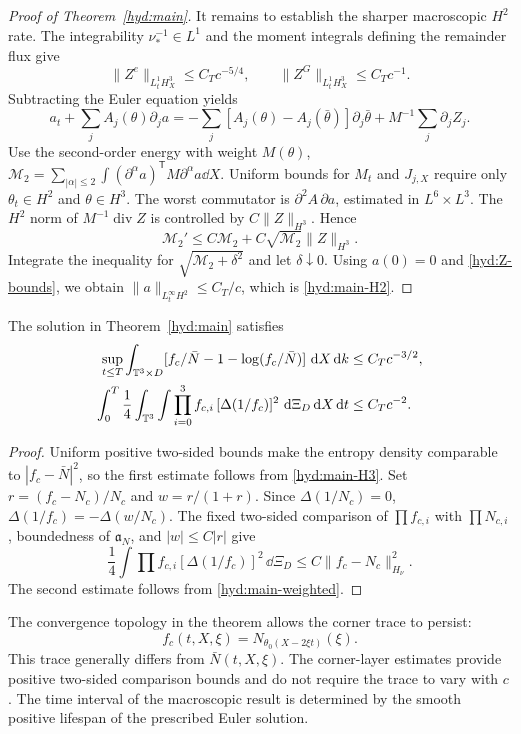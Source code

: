 \begin{proof}[Proof of Theorem~\ref{hyd:main}]
 It remains to establish the sharper macroscopic $H^2$ rate. The
 integrability $\nu_*^{-1}\in L^1$ and the moment integrals defining
 the remainder flux give
 \begin{equation}\label{hyd:Z-bounds}
 \|Z^e\|_{L^1_tH_X^3}\le C_Tc^{-5/4},\qquad
 \|Z^G\|_{L^1_tH_X^3}\le C_Tc^{-1}.
 \end{equation}
 Subtracting the Euler equation yields
 \[
 a_t+\sum_jA_j(\theta)\partial_ja
 =-\sum_j[A_j(\theta)-A_j(\bar\theta)]\partial_j\bar\theta
                           +M^{-1}\sum_j\partial_jZ_j.
 \]
 Use the second-order energy with weight $M(\theta)$,
 $\mathcal M_2=\sum_{|\alpha|\le2}
 \int(\partial^\alpha a)^{\mathsf T}M\partial^\alpha a\dd X$.
 Uniform bounds for $M_t$ and $J_{j,X}$ require only
 $\theta_t\in H^2$ and $\theta\in H^3$. The worst commutator is
 $\partial^2 A\,\partial a$, estimated in $L^6\times L^3$.
 The $H^2$ norm of $M^{-1}\operatorname{div}Z$ is controlled by
 $C\|Z\|_{H^3}$. Hence
 \[
 \mathcal M_2'\le C\mathcal M_2
                   +C\sqrt{\mathcal M_2}\|Z\|_{H^3}.
 \]
 Integrate the inequality for $\sqrt{\mathcal M_2+\delta^2}$ and let
 $\delta\downarrow0$. Using $a(0)=0$ and \eqref{hyd:Z-bounds}, we obtain
 $\|a\|_{L^\infty_tH^2}\le C_T/c$, which is \eqref{hyd:main-H2}.
\end{proof}

\begin{corollary}\label{hyd:entropy}
 The solution in Theorem~\ref{hyd:main} satisfies
 \begin{align}
 \sup_{t\le T}\int_{\mathbb T^3\times D}
     [f_c/\bar N-1-\log(f_c/\bar N)]\,\,\mathrm d X\,\mathrm d k
       &\le C_Tc^{-3/2},\label{hyd:entropy-bound}\\
 \int_0^T\frac14\int_{\mathbb T^3}\int
     \prod_{i=0}^3 f_{c,i}\,[\Delta(1/f_c)]^2
                   \,\,\mathrm d\Xi_D\,\mathrm d X\,\mathrm d t
       &\le C_Tc^{-2}.\label{hyd:dissipation-bound}
 \end{align}
\end{corollary}
\begin{proof}
 Uniform positive two-sided bounds make the entropy density comparable
 to $|f_c-\bar N|^2$, so the first estimate follows from
 \eqref{hyd:main-H3}. Set $r=(f_c-N_c)/N_c$ and $w=r/(1+r)$.
 Since $\Delta(1/N_c)=0$,
 $\Delta(1/f_c)=-\Delta(w/N_c)$.
 The fixed two-sided comparison of $\prod f_{c,i}$ with
 $\prod N_{c,i}$, boundedness of $\mathfrak a_N$, and $|w|\le C|r|$ give
 \[
 \frac14\int\prod f_{c,i}[\Delta(1/f_c)]^2\,\dd\Xi_D
     \le C\|f_c-N_c\|_{H_\nu}^2.
 \]
 The second estimate follows from \eqref{hyd:main-weighted}.
\end{proof}

\begin{remark}\label{hyd:corner-trace-remark}
 The convergence topology in the theorem allows the corner trace to persist:
 \[
  f_c(t,X,\xi)=N_{\theta_0(X-2\xi t)}(\xi).
 \]
 This trace generally differs from $\bar N(t,X,\xi)$. The corner-layer
 estimates provide positive two-sided comparison bounds and do not
 require the trace to vary with $c$. The time interval of the
 macroscopic result is determined by the smooth positive lifespan
 of the prescribed Euler solution.
\end{remark}
